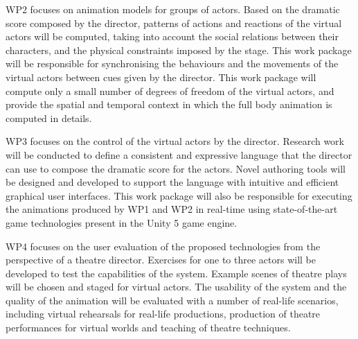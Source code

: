 WP2 focuses on animation models for groups of actors. Based on the dramatic score composed by the director, patterns of actions and reactions of the virtual actors will be computed, 
taking into account the social relations between their characters, and the physical constraints imposed by the stage. This work package will be responsible for synchronising the behaviours
and the movements of the virtual actors between cues given by the director.  This work package will compute only a small number of degrees of freedom of the virtual actors, and provide the spatial and temporal context in which the full body animation is computed in details.

WP3 focuses on the control of the virtual actors by the director. Research work will be conducted to define a consistent and expressive  language that the director can use to 
compose the dramatic score for the actors. Novel authoring tools will be designed and developed to support the language with intuitive and efficient graphical user interfaces. 
This work package will also be responsible for executing  the animations produced by WP1 and WP2 in real-time using state-of-the-art game technologies present in the Unity 5 
game engine. 

WP4 focuses on the user evaluation of the proposed technologies from the perspective of a theatre director. Exercises for one to three actors will be developed to test 
the capabilities of the system. Example scenes of theatre plays will be chosen and staged for virtual actors. The usability of the system and the quality of the animation
will be evaluated with a number of real-life scenarios, including virtual rehearsals for real-life productions, production of theatre performances for virtual worlds and
teaching of theatre techniques.

\endinput